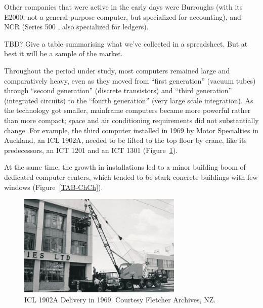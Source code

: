 \documentclass{IEEEcsmag}
\begin{document}
Other companies that were active in the early days were Burroughs (with its E2000, not a general-purpose computer, but specialized for accounting), and NCR (Series 500 , also specialized for ledgers).

TBD? Give a table summarising what we've collected in a spreadsheet. But at best it will be a sample of the market.

Throughout the period under study, most computers remained large and comparatively heavy, even as they moved from ``first generation'' (vacuum tubes) through ``second generation'' (discrete transistors) and ``third generation'' (integrated circuits) to the ``fourth generation'' (very large scale integration). As the technology got smaller, mainframe computers became more powerful rather than more compact; space and air conditioning requirements did not substantially change. For example, the third computer installed in 1969 by Motor Specialties in Auckland, an ICL 1902A, needed to be lifted to the top floor by crane, like its predecessors, an ICT 1201 and an ICT 1301 (Figure~\ref{MS1902A}).

At the same time, the growth in installations led to a minor building boom of dedicated computer centers, which tended to be stark concrete buildings with few windows (Figure~\ref{TAB-ChCh}).

\begin{figure}
\centerline{\includegraphics[width=18.5pc]{MotorSpec1902A-1969.jpg}}
\caption{\label{MS1902A}ICL 1902A Delivery in 1969. Courtesy Fletcher Archives, NZ.}\vspace*{-5pt}
\end{figure}
\end{document}
